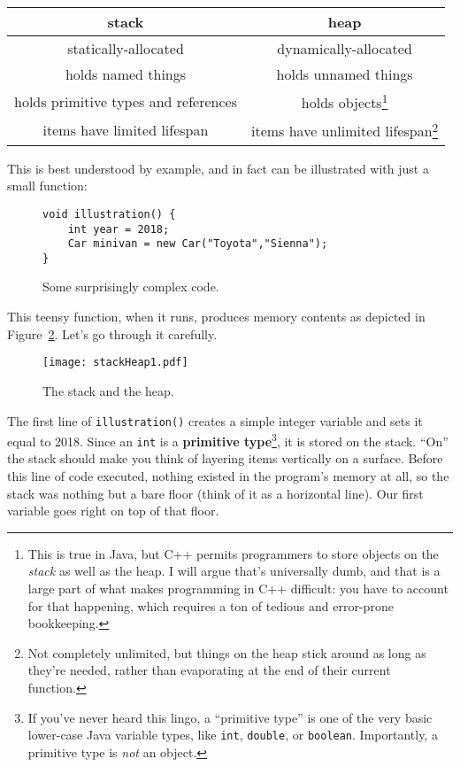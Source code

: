 \small
\vspace{.2in}
\begin{tabular}{c|c}
\textbf{stack} & \textbf{heap} \\
\hline
statically-allocated & dynamically-allocated \\
\index{names}
holds named things & holds unnamed things \\
holds primitive types and references & holds objects\footnote{This is
true in Java, but C++ permits programmers to store objects on the
\textit{stack} as well as the heap. I will argue that's universally dumb, and
that is a large part of what makes programming in C++ difficult: you have to
account for that happening, which requires a ton of tedious and error-prone
bookkeeping.} \\
\index{lifespan}
items have limited lifespan & items have unlimited lifespan\footnote{Not
completely unlimited, but things on the heap stick around as long as they're
needed, rather than evaporating at the end of their current function.} \\
\end{tabular}
\vspace{.2in}
\normalsize

This is best understood by example, and in fact can be illustrated with just a
small function:


\begin{figure}
\begin{Verbatim}[fontsize=\small,samepage=true,frame=single]
void illustration() {
    int year = 2018;
    Car minivan = new Car("Toyota","Sienna");
}
\end{Verbatim}
\caption{Some surprisingly complex code.}
\label{fig:firstCode}
\end{figure}

This teensy function, when it runs, produces memory contents as depicted in
Figure~\ref{fig:stackHeap1}. Let's go through it carefully.

\begin{figure}   %
\centering
\texttt{[image: stackHeap1.pdf]}
\caption{The stack and the heap.}
\label{fig:stackHeap1}
\end{figure}

The first line of \texttt{illustration()} creates a simple integer variable
and sets it equal to 2018. Since an \texttt{int} is a \textbf{primitive
type}\footnote{If you've never heard this lingo, a ``primitive type'' is one of
the very basic lower-case Java variable types, like \texttt{int},
\texttt{double}, or \texttt{boolean}. Importantly, a primitive type is
\textit{not} an object.}, it is stored on the stack. ``On'' the stack should
make you think of layering items vertically on a surface. Before this line of
code executed, nothing existed in the program's memory at all, so the stack
was nothing but a bare floor (think of it as a horizontal line). Our first
variable goes right on top of that floor.

